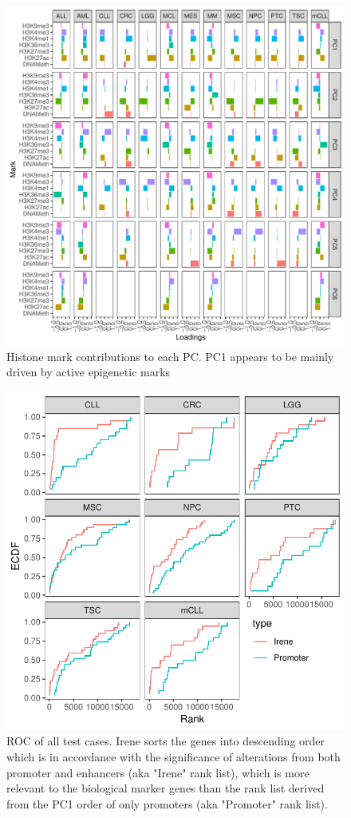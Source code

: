 \documentclass[a4paper,12pt]{article}
\begin{document}
\begin{figure}[!htb]
\centering
\includegraphics[scale=0.8]{figs/Loadings.pdf}
\caption{Histone mark contributions to each PC. PC1 appears to be mainly driven by active epigenetic marks}
\label{fig:pcload}
\end{figure}


\begin{figure}[!htb]
\centering
\includegraphics{figs/ROC.pdf}
\caption{ ROC of all test cases. Irene sorts the genes into descending order which is in accordance with the significance of alterations from both promoter and enhancers (aka "Irene" rank list), which is more relevant to the biological marker genes than the rank list derived from the PC1 order of only promoters (aka "Promoter" rank list).}
\label{fig:roc}
\end{figure}
\end{document}
